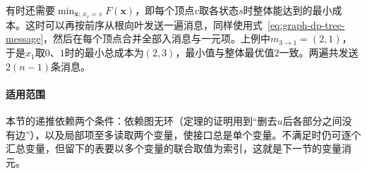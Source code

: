 有时还需要$\min_{\bm x:\,x_v=s}F(\bm x)$，即每个顶点$v$取各状态$s$时整体能达到的最小成本。这时可以再按前序从根向叶发送一遍消息，同样使用式~\eqref{eq:graph-dp-tree-message}，然后在每个顶点合并全部入消息与一元项。上例中$m_{3\to1}=(2,1)$，于是$x_1$取$0$、$1$时的最小总成本为$(2,3)$，最小值与整体最优值$2$一致。两遍共发送$2(n-1)$条消息。

\paragraph{适用范围}
本节的递推依赖两个条件：依赖图无环（定理的证明用到“删去$u$后各部分之间没有边”），以及局部项至多读取两个变量，使接口总是单个变量。不满足时仍可逐个汇总变量，但留下的表要以多个变量的联合取值为索引，这就是下一节的变量消元。
